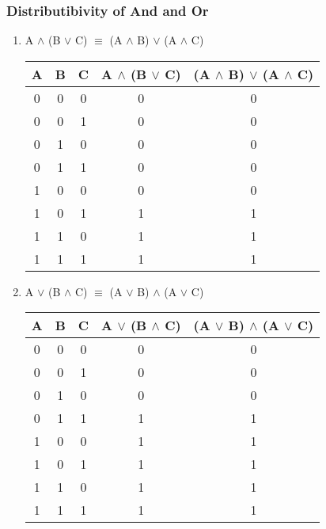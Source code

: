 \documentclass[12pt]{article}
\begin{document}
\subsubsection{Distributibivity of And and Or}
\begin{enumerate}

  \item A $\land$ (B $\lor$ C) $\equiv$ (A $\land$ B) $\lor$ (A $\land$ C)

\begin{center}
  \begin{tabular}{| c | c | c | c | c |}
    \hline
    A & B & C & A $\land$ (B $\lor$ C) & (A $\land$ B) $\lor$ (A $\land$ C) \\ \hline
    0 & 0 & 0 & 0 & 0 \\
    0 & 0 & 1 & 0 & 0 \\
    0 & 1 & 0 & 0 & 0 \\
    0 & 1 & 1 & 0 & 0 \\
    1 & 0 & 0 & 0 & 0 \\
    1 & 0 & 1 & 1 & 1 \\
    1 & 1 & 0 & 1 & 1 \\
    1 & 1 & 1 & 1 & 1 \\ \hline
  \end{tabular}
\end{center}

  \item A $\lor$ (B $\land$ C) $\equiv$ (A $\lor$ B) $\land$ (A $\lor$ C)

\begin{center}
  \begin{tabular}{| c | c | c | c | c |}
    \hline
    A & B & C & A $\lor$ (B $\land$ C) & (A $\lor$ B) $\land$ (A $\lor$ C) \\ \hline
    0 & 0 & 0 & 0 & 0 \\
    0 & 0 & 1 & 0 & 0 \\
    0 & 1 & 0 & 0 & 0 \\
    0 & 1 & 1 & 1 & 1 \\
    1 & 0 & 0 & 1 & 1 \\
    1 & 0 & 1 & 1 & 1 \\
    1 & 1 & 0 & 1 & 1 \\
    1 & 1 & 1 & 1 & 1 \\ \hline
  \end{tabular}
\end{center}
\end{enumerate}
\end{document}
